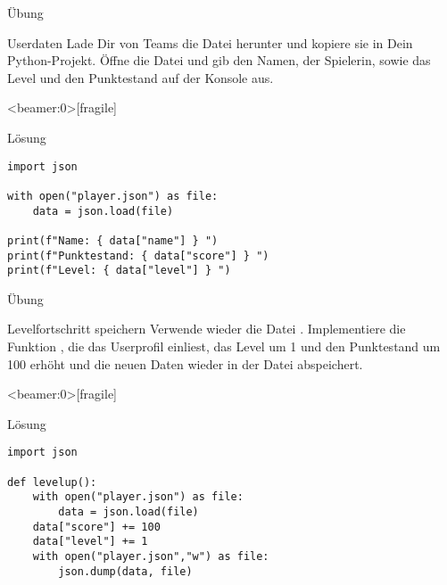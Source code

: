 \begin{frame}{Übung}
\begin{block}{Userdaten}
\vspace{2pt}
Lade Dir von Teams die Datei  herunter und kopiere sie in Dein Python-Projekt. 
Öffne die Datei und gib den Namen, der Spielerin, sowie das Level und den Punktestand auf der Konsole aus. 
\end{block}
\end{frame}



\begin{frame}<beamer:0>[fragile]{}
\begin{solutionblock}{Lösung}

\begin{verbatim}
import json 

with open("player.json") as file:
    data = json.load(file)

print(f"Name: { data["name"] } ")
print(f"Punktestand: { data["score"] } ")
print(f"Level: { data["level"] } ") 
\end{verbatim}
\end{solutionblock}
\end{frame}


\begin{frame}{Übung}
\begin{block}{Levelfortschritt speichern}
\vspace{2pt}
Verwende wieder die Datei . Implementiere die Funktion , die das Userprofil einliest, das Level um 1 und den Punktestand um 100 erhöht und die neuen Daten wieder in der Datei  abspeichert. 
\end{block}
\end{frame}


\begin{frame}<beamer:0>[fragile]{}
\begin{solutionblock}{Lösung}

\begin{verbatim}
import json 

def levelup(): 
    with open("player.json") as file:
        data = json.load(file)
    data["score"] += 100
    data["level"] += 1
    with open("player.json","w") as file: 
        json.dump(data, file)
\end{verbatim}
\end{solutionblock}
\end{frame}






